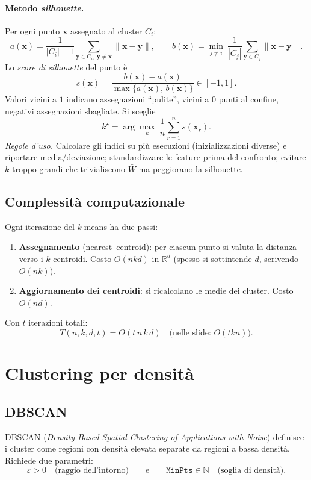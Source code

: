 \paragraph{Metodo \emph{silhouette}.}
Per ogni punto $\mathbf{x}$ assegnato al cluster $C_i$:
\[
a(\mathbf{x})=\frac{1}{|C_i|-1}\sum_{\mathbf{y}\in C_i,\ \mathbf{y}\neq \mathbf{x}}\!\!\!\!\|\mathbf{x}-\mathbf{y}\|, \qquad
b(\mathbf{x})=\min_{j\neq i}\ \frac{1}{|C_j|}\sum_{\mathbf{y}\in C_j}\|\mathbf{x}-\mathbf{y}\|.
\]
Lo \emph{score di silhouette} del punto è
\[
s(\mathbf{x})=\frac{b(\mathbf{x})-a(\mathbf{x})}{\max\{a(\mathbf{x}),\,b(\mathbf{x})\}}\in[-1,1].
\]
Valori vicini a $1$ indicano assegnazioni “pulite”, vicini a $0$ punti al confine, negativi assegnazioni sbagliate. Si sceglie
\[
k^\star=\arg\max_k\ \frac{1}{n}\sum_{r=1}^n s(\mathbf{x}_r).
\]
\emph{Regole d’uso.} Calcolare gli indici su più esecuzioni (inizializzazioni diverse) e riportare media/deviazione; standardizzare le feature prima del confronto; evitare $k$ troppo grandi che trivialiscono $\bar W$ ma peggiorano la silhouette.


\subsection{Complessità computazionale}\label{subsec:kmeans-compl}
Ogni iterazione del \emph{k}-means ha due passi:
\begin{enumerate}
  \item \textbf{Assegnamento} (nearest–centroid): per ciascun punto si valuta la distanza verso i $k$ centroidi. Costo $O(nkd)$ in $\mathbb{R}^d$ (spesso si sottintende $d$, scrivendo $O(nk)$).
  \item \textbf{Aggiornamento dei centroidi}: si ricalcolano le medie dei cluster. Costo $O(nd)$.
\end{enumerate}
Con $t$ iterazioni totali:
\[
T(n,k,d,t)=O(t\,n\,k\,d)\quad\text{(nelle slide: }O(tkn)\text{)}.
\]


\section{Clustering per densità}

\subsection{DBSCAN}\label{sec:dbscan}
DBSCAN (\emph{Density-Based Spatial Clustering of Applications with Noise}) definisce i cluster come regioni con densità elevata separate da regioni a bassa densità. Richiede due parametri:
\[
\varepsilon>0 \quad\text{(raggio dell'intorno)}\qquad\text{e}\qquad \texttt{MinPts}\in\mathbb{N}\quad\text{(soglia di densità)}.
\]

